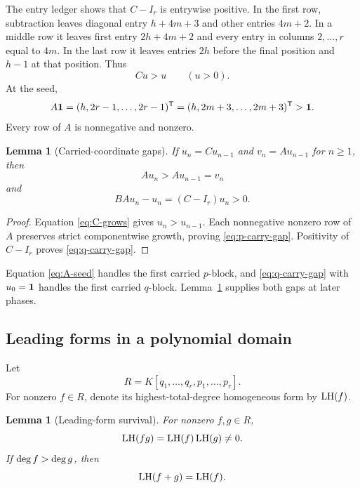 \documentclass[11pt]{article}
\newtheorem{lemma}[theorem]{Lemma}
\theoremstyle{remark}
\numberwithin{equation}{section}
\begin{document}
The entry ledger shows that \(C-I_r\) is entrywise positive.  In the first
row, subtraction leaves diagonal entry \(h+4m+3\) and other entries
\(4m+2\).  In a middle row it leaves first entry \(2h+4m+2\) and every
entry in columns \(2,\ldots,r\) equal to \(4m\).  In the last row it
leaves entries \(2h\) before the final position and \(h-1\) at that
position.  Thus
\begin{equation}\label{eq:C-grows}
Cu>u\qquad(u>0).
\end{equation}
At the seed,
\begin{equation}\label{eq:A-seed}
A\mathbf{1}=(h,2r-1,\ldots,2r-1)^{\mathsf{T}}
=(h,2m+3,\ldots,2m+3)^{\mathsf{T}}>\mathbf{1}.
\end{equation}
Every row of \(A\) is nonnegative and nonzero.

\begin{lemma}[Carried-coordinate gaps]\label{lem:carries}
If \(u_n=Cu_{n-1}\) and \(v_n=Au_{n-1}\) for \(n\geq1\), then
\begin{equation}\label{eq:p-carry-gap}
Au_n>Au_{n-1}=v_n
\end{equation}
and
\begin{equation}\label{eq:q-carry-gap}
BAu_n-u_n=(C-I_r)u_n>0.
\end{equation}
\end{lemma}

\begin{proof}
Equation \eqref{eq:C-grows} gives \(u_n>u_{n-1}\).  Each nonnegative
nonzero row of \(A\) preserves strict componentwise growth, proving
\eqref{eq:p-carry-gap}.  Positivity of \(C-I_r\) proves
\eqref{eq:q-carry-gap}.
\end{proof}

Equation \eqref{eq:A-seed} handles the first carried \(p\)-block, and
\eqref{eq:q-carry-gap} with \(u_0=\mathbf{1}\) handles the first carried
\(q\)-block.  Lemma~\ref{lem:carries} supplies both gaps at later phases.

\subsection{Leading forms in a polynomial domain}

Let
\[
R=K[q_1,\ldots,q_r,p_1,\ldots,p_r].
\]
For nonzero \(f\in R\), denote its highest-total-degree homogeneous form by
\(\operatorname{LH}(f)\).

\begin{lemma}[Leading-form survival]\label{lem:leading-forms}
For nonzero \(f,g\in R\),
\begin{equation}\label{eq:LH-product}
\operatorname{LH}(fg)=\operatorname{LH}(f)\operatorname{LH}(g)\neq0.
\end{equation}
If \(\operatorname{deg} f>\operatorname{deg} g\), then
\begin{equation}\label{eq:LH-sum}
\operatorname{LH}(f+g)=\operatorname{LH}(f).
\end{equation}
\end{lemma}
\end{document}
